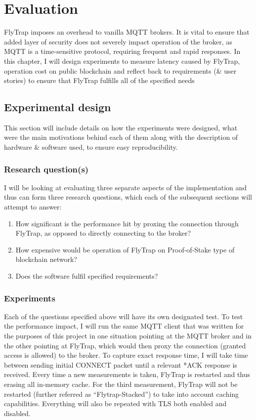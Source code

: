 \chapter{Evaluation}\label{chap:evaluation}
FlyTrap imposes an overhead to vanilla MQTT brokers. It is vital to ensure that added layer of security does not severely impact operation of the broker, as MQTT is a time-sensitive protocol, requiring frequent and rapid responses. In this chapter, I will design experiments to measure latency caused by FlyTrap, operation cost on public blockchain and reflect back to requirements (\& user stories) to ensure that FlyTrap fulfills all of the specified needs

\section{Experimental design}
This section will include details on how the experiments were designed, what were the main motivations behind each of them along with the description of hardware \& software used, to ensure easy reproducibility.
\subsection{Research question(s)}
I will be looking at evaluating three separate aspects of the implementation and thus can form three research questions, which each of the subsequent sections will attempt to answer:
\begin{enumerate}
  \item How significant is the performance hit by proxing the connection through FlyTrap, as opposed to directly connecting to the broker?
  \item How expensive would be operation of FlyTrap on Proof-of-Stake type of blockchain network?
  \item Does the software fulfil specified requirements?
\end{enumerate}
\subsection{Experiments}
Each of the questions specified above will have its own designated test. To test the performance impact, I will run the same MQTT client that was written for the purposes of this project in one situation pointing at the MQTT broker and in the other pointing at FlyTrap, which would then proxy the connection (granted access is allowed) to the broker. To capture exact response time, I will take time between sending initial CONNECT packet until a relevant *ACK response is received. Every time a new measurements is taken, FlyTrap is restarted and thus erasing all in-memory cache. For the third measurement, FlyTrap will not be restarted (further referred as ``Flytrap-Stacked'') to take into account caching capabilities. Everything will also be repeated with TLS both enabled and disabled.

